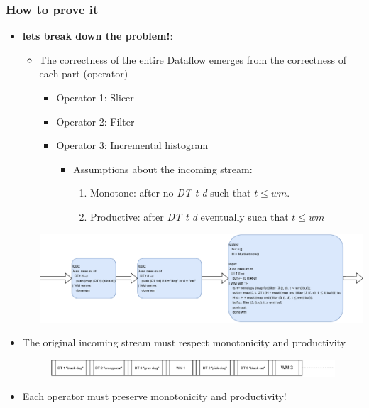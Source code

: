 \documentclass[aspectratio=169,10pt]{beamer}
\begin{document}
\begin{frame}
  \frametitle{How to prove it}
  \begin{itemize}
    \item \textbf{lets break down the problem!}:
          \begin{itemize}
            \item The correctness of the entire Dataflow emerges from the correctness of each part (operator)
                  \begin{itemize}
                    \item Operator 1: Slicer
                    \item Operator 2: Filter
                    \item Operator 3: Incremental histogram
                          \begin{itemize}
                            \item Assumptions about the incoming stream:
                                  \begin{enumerate}
                                    \item Monotone: after  no \textit{DT t d} such that $t \le wm$.
                                    \item Productive: after \textit{DT t d} eventually  such that $t \le wm$
                                  \end{enumerate}
                          \end{itemize}
                  \end{itemize}
                  \includegraphics[width=.6\textwidth]{dataflow_ex1_b.pdf}
          \end{itemize}
    \item The original incoming stream must respect monotonicity and productivity
          \begin{figure}
            \centering
            \includegraphics[width=.70\textwidth]{stream_ex1.pdf}
          \end{figure}
    \item Each operator must preserve monotonicity and productivity!
  \end{itemize}
\end{frame}
\end{document}
